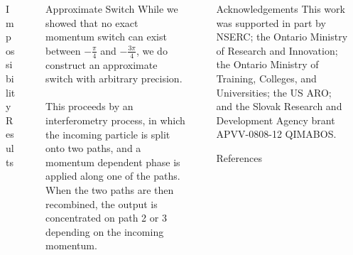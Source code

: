 \documentclass{beamer}
\newlength{\sepwid}
\newlength{\onecolwid}
\begin{document}
\begin{frame}[t]
\begin{columns}[t]
\begin{column}{\onecolwid}
\begin{block}{Impossibility Results}
       \end{block}
    \end{column}
    
    \begin{column}{\sepwid}\end{column}
    \begin{column}{\onecolwid}
     \begin{block}{Approximate Switch}
        While we showed that no exact momentum switch can exist between $-\frac{\pi}{4}$ and $-\frac{3\pi}{4}$, we do construct an approximate switch with arbitrary precision. 
        \\~\\
        This proceeds by an interferometry process, in which the incoming particle is split onto two paths, and a momentum dependent phase is applied along one of the paths.  When the two paths are then recombined, the output is concentrated on path 2 or 3 depending on the incoming momentum.  
      \end{block}
    \end{column}
    
    \begin{column}{\sepwid}\end{column}
    \begin{column}{\onecolwid}
      \begin{block}{Acknowledgements}
         \footnotesize{This work was supported in part by NSERC; the Ontario Ministry of Research and Innovation; the Ontario Ministry of Training, Colleges, and Universities; the US ARO; and the Slovak Research and Development Agency brant APVV-0808-12 QIMABOS.}
      \end{block}
      
      \begin{block}{References}
        
        \nocite{*}
        \footnotesize{}
      \end{block}
      
    \end{column}  
    
    \begin{column}{\sepwid}\end{column}
  \end{columns}     

      
    
\end{frame}
\end{document}
